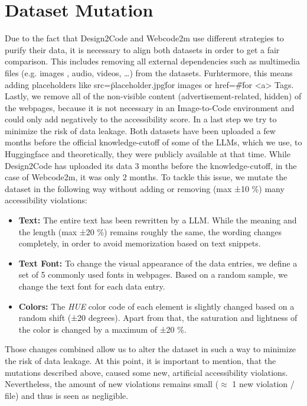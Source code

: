 \section{Dataset Mutation}
Due to the fact that Design2Code and Webcode2m use different strategies to purify
their data, it is necessary to align both datasets in order to get a fair comparison.
This includes removing all external dependencies such as multimedia files (e.g. images
, audio, videos, {\ldots}) from the datasets. Furhtermore, this means adding 
placeholders like src=\"placeholder.jpg\" for images or href=\"\#\" for <a> Tags.
Lastly, we remove all of the non-visible content (advertisement-related, hidden) 
of the webpages, because it is not necessary in an Image-to-Code environment and 
could only add negatively to the accessibility score.\newline
In a last step we try to minimize the risk of data leakage. Both datasets have been
uploaded a few months before the official knowledge-cutoff of some of the LLMs, which
we use, to Huggingface and theoretically, they were publicly available at that time. 
While Design2Code has uploaded its data 3 months before the knowledge-cutoff, in the 
case of Webcode2m, it was only 2 months. To tackle this issue, we mutate the dataset
in the following way without adding or removing (max ±10 \%) many 
accessibility violations:
\begin{itemize}
  \item \textbf{Text:} The entire text has been rewritten by a LLM. While the meaning
    and the length (max ±20 \%) remains roughly the same, the wording changes
    completely, in order to avoid memorization based on text snippets.
  \item \textbf{Text Font:} To change the visual appearance of the data entries, we 
    define a set of 5 commonly used fonts in webpages. Based on a random sample, we 
    change the text font for each data entry.
  \item \textbf{Colors:} The \textit{HUE} color code of each element is slightly
    changed based on a random shift (±20 degrees). Apart from that, the saturation
    and lightness of the color is changed by a maximum of ±20 \%.
\end{itemize}
Those changes combined allow us to alter the dataset in such a way to minimize the
risk of data leakage. At this point, it is important to mention, that the mutations
described above, caused some new, artificial accessibility violations. Nevertheless,
the amount of new violations remains small ($\approx$ 1 new violation / file) and 
thus is seen as negligible.


